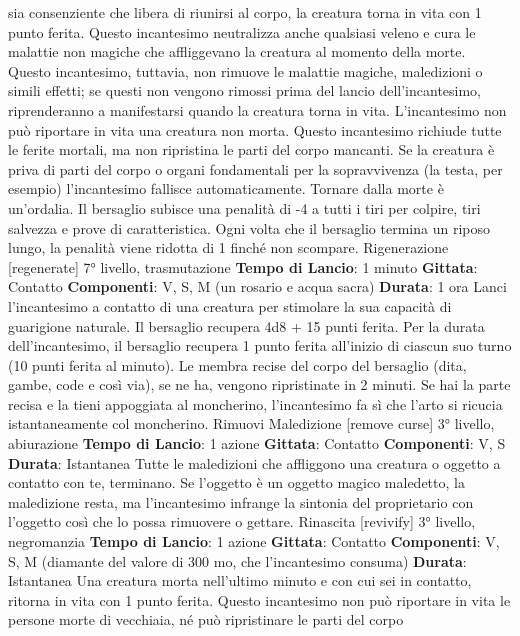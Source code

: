 \begin{multicols}{2}
sia consenziente che libera di riunirsi al corpo, la
creatura torna in vita con 1 punto ferita.
Questo incantesimo neutralizza anche qualsiasi veleno
e cura le malattie non magiche che affliggevano la
creatura al momento della morte. Questo incantesimo,
tuttavia, non rimuove le malattie magiche, maledizioni o
simili effetti; se questi non vengono rimossi prima del
lancio dell’incantesimo, riprenderanno a manifestarsi
quando la creatura torna in vita. L’incantesimo non può
riportare in vita una creatura non morta.
Questo incantesimo richiude tutte le ferite mortali, ma
non ripristina le parti del corpo mancanti. Se la creatura
è priva di parti del corpo o organi fondamentali per la
sopravvivenza (la testa, per esempio) l’incantesimo
fallisce automaticamente.
Tornare dalla morte è un’ordalia. Il bersaglio subisce
una penalità di -4 a tutti i tiri per colpire, tiri salvezza e
prove di caratteristica. Ogni volta che il bersaglio
termina un riposo lungo, la penalità viene ridotta di 1
finché non scompare.
Rigenerazione
[regenerate]
7° livello, trasmutazione
\textbf{Tempo di Lancio}: 1 minuto
\textbf{Gittata}: Contatto
\textbf{Componenti}: V, S, M (un rosario e acqua sacra)
\textbf{Durata}: 1 ora
Lanci l’incantesimo a contatto di una creatura per
stimolare la sua capacità di guarigione naturale. Il
bersaglio recupera 4d8 + 15 punti ferita. Per la durata
dell’incantesimo, il bersaglio recupera 1 punto ferita
all’inizio di ciascun suo turno (10 punti ferita al minuto).
Le membra recise del corpo del bersaglio (dita, gambe,
code e così via), se ne ha, vengono ripristinate in 2
minuti. Se hai la parte recisa e la tieni appoggiata al
moncherino, l’incantesimo fa sì che l’arto si ricucia
istantaneamente col moncherino.
Rimuovi Maledizione
[remove curse]
3° livello, abiurazione
\textbf{Tempo di Lancio}: 1 azione
\textbf{Gittata}: Contatto
\textbf{Componenti}: V, S
\textbf{Durata}: Istantanea
Tutte le maledizioni che affliggono una creatura o
oggetto a contatto con te, terminano. Se l’oggetto è un
oggetto magico maledetto, la maledizione resta, ma
l’incantesimo infrange la sintonia del proprietario con
l’oggetto così che lo possa rimuovere o gettare.
Rinascita
[revivify]
3° livello, negromanzia
\textbf{Tempo di Lancio}: 1 azione
\textbf{Gittata}: Contatto
\textbf{Componenti}: V, S, M (diamante del valore di 300 mo,
che l’incantesimo consuma)
\textbf{Durata}: Istantanea
Una creatura morta nell’ultimo minuto e con cui sei in
contatto, ritorna in vita con 1 punto ferita. Questo
incantesimo non può riportare in vita le persone morte
di vecchiaia, né può ripristinare le parti del corpo

\end{multicols}
